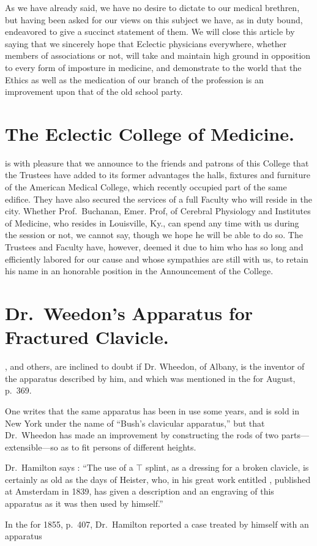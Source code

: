 
As we have already said, we have no desire to dictate to our medical
brethren, but having been asked for our views on this subject we
have, as in duty bound, endeavored to give a succinct statement of them.
We will close this article by saying that we sincerely hope that Eclectic
physicians everywhere, whether members of associations or not, will
take and maintain high ground in opposition to every form of imposture
in medicine, and demonstrate to the world that the Ethics as well
as the medication of our branch of the profession is an improvement
upon that of the old school party.

\smallornament
\section*{The Eclectic College of Medicine.}

 is with pleasure that we announce to the friends and patrons of this
College that the Trustees have added to its former advantages the halls,
fixtures and furniture of the American Medical College, which recently
occupied part of the same edifice. They have also secured the services
of a full Faculty who will reside in the city. Whether Prof.~Buchanan,
Emer. Prof, of Cerebral Physiology and Institutes of Medicine, who
resides in Louisville, Ky., can spend any time with us during the session
or not, we cannot say, though we hope he will be able to do so. The
Trustees and Faculty have, however, deemed it due to him who has so
long and efficiently labored for our cause and whose sympathies are still
with us, to retain his name in an honorable position in the Announcement
of the College.

\smallornament
\section*{Dr.\ Weedon's Apparatus for Fractured Clavicle.}

, and others, are inclined to doubt if Dr.
Wheedon, of Albany, is the inventor of the apparatus described by him,
and which was mentioned in the  for August, p.\ 369.

One writes that the same apparatus has been in use some years, and
is sold in New York under the name of ``Bush's clavicular apparatus,''
but that Dr.\ Wheedon has made an improvement by constructing the
rods of two parts---extensible---so as to fit persons of different heights.

Dr.\ Hamilton says : ``The use of a $\top$ splint, as a dressing for a broken
clavicle, is certainly as old as the days of Heister, who, in his great work
entitled , published at Amsterdam in 1839, has
given a description and an engraving of this apparatus as it was then
used by himself.''

In the  for 1855,
p.~407, Dr.\ Hamilton reported a case treated by himself with an apparatus\endinput
